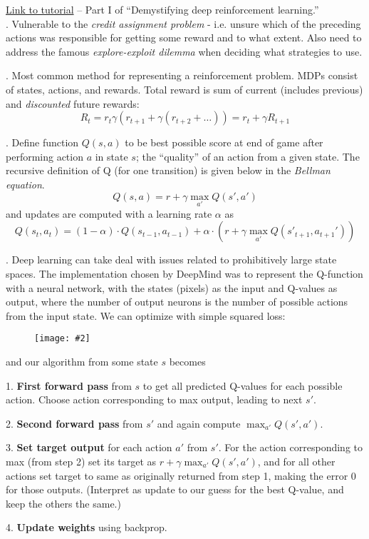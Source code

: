 \documentclass[11pt]{article}
\newcommand\myfig[2][0.3\textwidth]{\begin{figure}[h!]\centering\texttt{[image: \#2]}\end{figure}}
\newcommand\myspace[1][]{\vspace{#1\bigskipamount}}
\newcommand\p{\Needspace{10\baselineskip} \noindent}
\begin{document}
\href{https://www.nervanasys.com/demystifying-deep-reinforcement-learning/}{Link to tutorial} -- Part I of ``Demystifying deep reinforcement learning.'' \\


\p {}. Vulnerable to the \textit{credit assignment problem} - i.e. unsure which of the preceding actions was responsible for getting some reward and to what extent. Also need to address the famous \textit{explore-exploit dilemma} when deciding what strategies to use. 


\myspace
\p {}. Most common method for representing a reinforcement problem. MDPs consist of states, actions, and rewards. Total reward is sum of current (includes previous) and \textit{discounted} future rewards:
\begin{equation}
R_t = r_t \gamma(r_{t + 1}
+ \gamma(r_{t + 2} + \ldots)) = r_t + \gamma R_{t + 1}
\end{equation}

\myspace
\p {}. Define function $Q(s, a)$ to be best possible score at end of game after performing action $a$ in state $s$; the ``quality'' of an action from a given state. The recursive definition of Q (for one transition) is given below in the \textit{Bellman equation}. 
$$ Q(s, a) = r + \gamma \max_{a'} Q(s', a') $$
and updates are computed with a learning rate $\alpha$ as
$$ Q(s_t, a_t) = (1 - \alpha)\cdot Q(s_{t -1}, a_{t - 1})
+ 	\alpha \cdot (r + \gamma \max_{a'} Q(s'_{t + 1}, a_{t+1}') ) $$

\myspace
\p {}. Deep learning can take deal with issues related to prohibitively large state spaces. The implementation chosen by DeepMind was to represent the Q-function with a neural network, with the states (pixels) as the input and Q-values as output, where the number of output neurons is the number of possible actions from the input state. We can optimize with simple squared loss:

\myfig{DRL_loss.PNG}

and our algorithm from some state $s$ becomes
\begin{compactitem}
	\item[1.] \textbf{First forward pass} from $s$ to get all predicted Q-values for each possible action. Choose action corresponding to max output, leading to next $s'$.
	
	\item[2.] \textbf{Second forward pass} from $s'$ and again compute $\max_{a'} Q(s', a')$. 
	
	\item[3.] \textbf{Set target output} for each action $a'$ from $s'$. For the action corresponding to max (from step 2) set its target as $r + \gamma \max_{a'} Q(s', a')$, and for all other actions set target to same as originally returned from step 1, making the error 0 for those outputs. (Interpret as update to our guess for the best Q-value, and keep the others the same.)
	
	\item[4.] \textbf{Update weights} using backprop. 
\end{compactitem}
\end{document}
